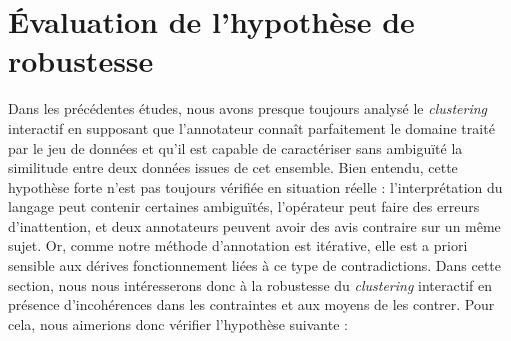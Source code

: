 \section{Évaluation de l'hypothèse de robustesse}
\label{section:4.6-HYPOTHESE-ROBUSTESSE}

	Dans les précédentes études, nous avons presque toujours analysé le \textit{clustering} interactif en supposant que l'annotateur connaît parfaitement le domaine traité par le jeu de données et qu'il est capable de caractériser sans ambiguïté la similitude entre deux données issues de cet ensemble.
	Bien entendu, cette hypothèse forte n'est pas toujours vérifiée en situation réelle : l'interprétation du langage peut contenir certaines ambiguïtés, l'opérateur peut faire des erreurs d’inattention, et deux annotateurs peuvent avoir des avis contraire sur un même sujet.
	Or, comme notre méthode d'annotation est itérative, elle est a priori sensible aux dérives fonctionnement liées à ce type de contradictions.
	Dans cette section, nous nous intéresserons donc à la robustesse du \textit{clustering} interactif en présence d'incohérences dans les contraintes et aux moyens de les contrer.
	Pour cela, nous aimerions donc vérifier l'hypothèse suivante :
	

